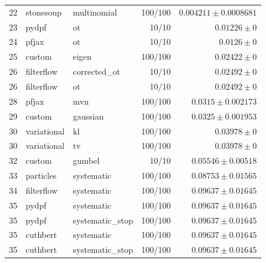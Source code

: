 \begin{table}[!htbp]
\begin{tabular}{rllrr}
22 & stonesoup & multinomial & 100/100 & $0.004211 \pm 0.0008681$ \\
23 & pydpf & ot & 10/10 & $0.01226 \pm 0$ \\
24 & pfjax & ot & 10/10 & $0.0126 \pm 0$ \\
25 & custom & eigen & 100/100 & $0.02422 \pm 0$ \\
26 & filterflow & corrected\_ot & 10/10 & $0.02492 \pm 0$ \\
26 & filterflow & ot & 10/10 & $0.02492 \pm 0$ \\
28 & pfjax & mvn & 100/100 & $0.0315 \pm 0.002173$ \\
29 & custom & gaussian & 100/100 & $0.0325 \pm 0.001953$ \\
30 & variational & kl & 100/100 & $0.03978 \pm 0$ \\
30 & variational & tv & 100/100 & $0.03978 \pm 0$ \\
32 & custom & gumbel & 10/10 & $0.05546 \pm 0.00518$ \\
33 & particles & systematic & 100/100 & $0.08753 \pm 0.01565$ \\
34 & filterflow & systematic & 100/100 & $0.09637 \pm 0.01645$ \\
35 & pydpf & systematic & 100/100 & $0.09637 \pm 0.01645$ \\
35 & pydpf & systematic\_stop & 100/100 & $0.09637 \pm 0.01645$ \\
35 & cuthbert & systematic & 100/100 & $0.09637 \pm 0.01645$ \\
35 & cuthbert & systematic\_stop & 100/100 & $0.09637 \pm 0.01645$ \\
\bottomrule
\end{tabular}
\end{table}

